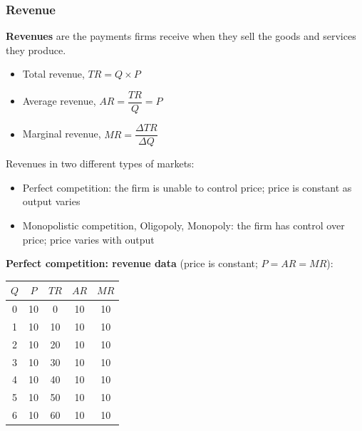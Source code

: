 \documentclass[a4paper,12pt]{article}
\newcommand{\needbold}[1]{\textcolor{red!70!black}{\textbf{#1}}}
\begin{document}
\subsubsection*{Revenue}
\needbold{Revenues} are the payments firms receive when they sell the goods and services they produce.
\begin{itemize}
  \item Total revenue, $TR=Q\times P$
  \item Average revenue, $AR=\dfrac{TR}{Q}=P$ 
  \item Marginal revenue, $MR=\dfrac{\Delta TR}{\Delta Q}$
\end{itemize}
Revenues in two different types of markets:
\begin{itemize}
  \item Perfect competition: the firm is unable to control price; price is constant as output varies
  \item Monopolistic competition, Oligopoly, Monopoly: the firm has control over price; price varies with output
\end{itemize}
\textbf{Perfect competition: revenue data} (price is constant; $P = AR = MR$):
\begin{center}
\begin{tabular}{ccccc}
\toprule
$Q$ & $P$ & $TR$ & $AR$ & $MR$ \\
\midrule
0 & 10 & 0  & 10 & 10 \\
1 & 10 & 10 & 10 & 10 \\
2 & 10 & 20 & 10 & 10 \\
3 & 10 & 30 & 10 & 10 \\
4 & 10 & 40 & 10 & 10 \\
5 & 10 & 50 & 10 & 10 \\
6 & 10 & 60 & 10 & 10 \\
\bottomrule
\end{tabular}
\end{center}
\begin{center}
\end{center}
\end{document}
